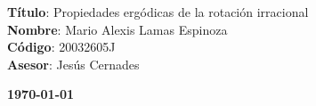 \documentclass[a4paper,12pt]{report}
\theoremstyle{definition}
\begin{document}
	\begin{center}
		{\Large \textbf{Título}: Propiedades ergódicas de la rotación irracional\\		
		\textbf{Nombre}: Mario Alexis Lamas Espinoza\\		
		\textbf{Código}: 20032605J\\			
		\textbf{Asesor}: Jesús Cernades\\}
	\end{center}

	\begin{center}
		{\Large \textbf{\today}}
	\end{center}
	
	\onehalfspacing
	
	\tableofcontents
	
	
	
	 
	
	
	
	
\printbibliography[heading=bibintoc]
\end{document}
